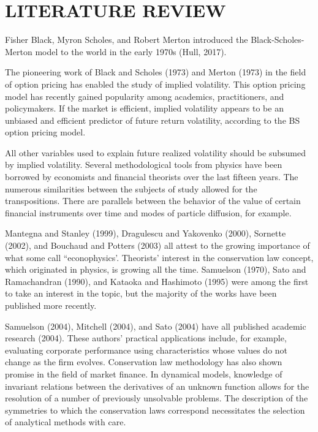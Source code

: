 \documentclass[a4 paper, 12pt]{report}
\theoremstyle{plain}
\begin{document}
\chapter{LITERATURE REVIEW}
\noindent
\par Fisher Black, Myron Scholes, and Robert Merton introduced the Black-Scholes-Merton model to the world in the early 1970s (Hull, 2017).\\
\par The pioneering work of Black and Scholes (1973) and Merton (1973) in the field of option pricing has enabled the study of implied volatility. This option pricing model has recently gained popularity among academics, practitioners, and policymakers.
If the market is efficient, implied volatility appears to be an unbiased and efficient predictor of future return volatility, according to the BS option pricing model.\\

\par All other variables used to explain future realized volatility should be subsumed by implied volatility.
Several methodological tools from physics have been borrowed by economists and financial theorists over the last fifteen years. The numerous similarities between the subjects of study allowed for the transpositions. There are parallels between the behavior of the value of certain financial instruments over time and modes of particle diffusion, for example.\\
\par Mantegna and Stanley (1999), Dragulescu and Yakovenko (2000), Sornette (2002), and Bouchaud and Potters (2003) all attest to the growing importance of what some call ``econophysics’. Theorists' interest in the conservation law concept, which originated in physics, is growing all the time. Samuelson (1970), Sato and Ramachandran (1990), and Kataoka and Hashimoto (1995) were among the first to take an interest in the topic, but the majority of the works have been published more recently.\\

\par Samuelson (2004), Mitchell (2004), and Sato (2004) have all published academic research (2004). These authors' practical applications include, for example, evaluating corporate performance using characteristics whose values do not change as the firm evolves. Conservation law methodology has also shown promise in the field of market finance. In dynamical models, knowledge of invariant relations between the derivatives of an unknown function allows for the resolution of a number of previously unsolvable problems. The description of the symmetries to which the conservation laws correspond necessitates the selection of analytical methods with care.\\
\end{document}
